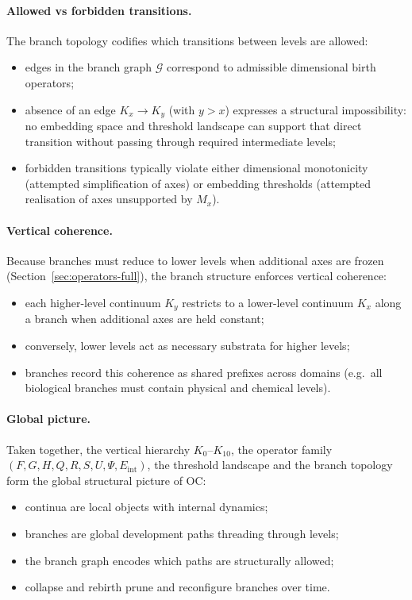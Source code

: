 \paragraph{Allowed vs forbidden transitions.}
The branch topology codifies which transitions between levels are allowed:
\begin{itemize}
  \item edges in the branch graph \(\mathcal{G}\) correspond to admissible
        dimensional birth operators;
  \item absence of an edge \(K_x \to K_y\) (with \(y>x\)) expresses a
        structural impossibility: no embedding space and threshold landscape
        can support that direct transition without passing through required
        intermediate levels;
  \item forbidden transitions typically violate either dimensional
        monotonicity (attempted simplification of axes) or embedding
        thresholds (attempted realisation of axes unsupported by \(M_x\)).
\end{itemize}

\paragraph{Vertical coherence.}
Because branches must reduce to lower levels when additional axes are frozen
(Section~\ref{sec:operators-full}), the branch structure enforces vertical
coherence:
\begin{itemize}
  \item each higher-level continuum \(K_y\) restricts to a lower-level
        continuum \(K_x\) along a branch when additional axes are held
        constant;
  \item conversely, lower levels act as necessary substrata for higher levels;
  \item branches record this coherence as shared prefixes across domains
        (e.g.\ all biological branches must contain physical and chemical
        levels).
\end{itemize}

\paragraph{Global picture.}
Taken together, the vertical hierarchy \(K_0\)–\(K_{10}\), the operator
family \((F,G,H,Q,R,S,U,\Psi,E_{\mathrm{int}})\), the threshold landscape
and the branch topology form the global structural picture of OC:
\begin{itemize}
  \item continua are local objects with internal dynamics;
  \item branches are global development paths threading through levels;
  \item the branch graph encodes which paths are structurally allowed;
  \item collapse and rebirth prune and reconfigure branches over time.
\end{itemize}

